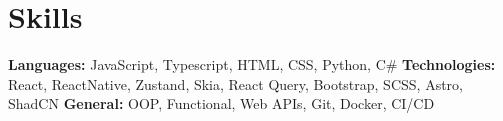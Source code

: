 \vspace{5 pt - 0.5 cm}
\section{Skills}
\begin{onecolentry}
    \textbf{Languages:} JavaScript, Typescript, HTML, CSS, Python, C\# \newline
    \textbf{Technologies:} React, ReactNative, Zustand, Skia, React Query, Bootstrap, SCSS, Astro, ShadCN   \newline
    \textbf{General:} OOP, Functional, Web APIs, Git, Docker, CI/CD \newline
\end{onecolentry}